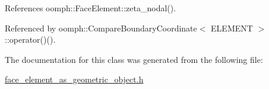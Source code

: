 References oomph\+::\+Face\+Element\+::zeta\+\_\+nodal().



Referenced by oomph\+::\+Compare\+Boundary\+Coordinate$<$ E\+L\+E\+M\+E\+N\+T $>$\+::operator()().



The documentation for this class was generated from the following file\+:\begin{DoxyCompactItemize}
\item 
\hyperlink{face__element__as__geometric__object_8h}{face\+\_\+element\+\_\+as\+\_\+geometric\+\_\+object.\+h}\end{DoxyCompactItemize}
